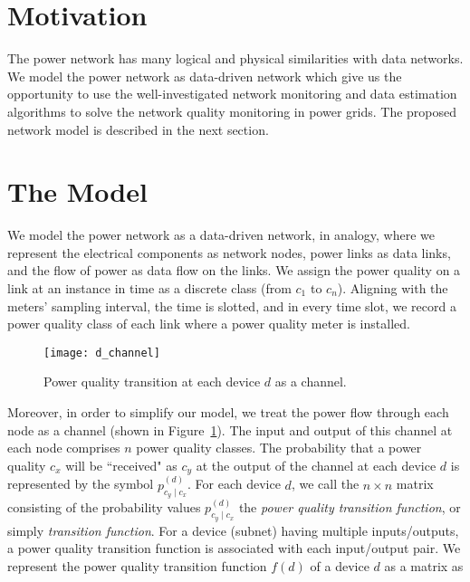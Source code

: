 \label{chap:networkModel}
\section{Motivation}
The power network has many logical and physical similarities with data networks. We model the power network as data-driven network which give us the opportunity to use the well-investigated network monitoring and data estimation algorithms to solve the network quality monitoring in power grids. The proposed network model is described in the next section.

\section{The Model}
We model the power network as a data-driven network, in analogy, where we represent the electrical components as network nodes, power links as data links, and the flow of power as data flow on the links. We assign the power quality on a link at an instance in time as a discrete class (from $c_1$ to $c_n$). Aligning with the meters' sampling interval, the time is slotted, and in every time slot, we record a power quality class of each link where a power quality meter is installed. 

\begin{figure}[!p]
    \centering
    \texttt{[image: d\_channel]}
    \vspace{0.5cm}
    \caption{Power quality transition at each device $d$ as a channel.}
    \vspace{2cm}
    \label{fig:d_channel}
\end{figure}

Moreover, in order to simplify our model, we treat the power flow through each node as a channel (shown in Figure~\ref{fig:d_channel}). The input and output of this channel at each node comprises $n$ power quality classes. The probability that a power quality $c_x$ will be ``received" as $c_y$ at the output of the channel at each device $d$ is represented by the symbol $p_{c_y  \mid c_x}^{(d)}$. For each device $d$, we call the $n\times n$ matrix consisting of the probability values  $p_{c_y  \mid c_x}^{(d)}$ the \emph{power quality transition function}, or simply \emph{transition function}. For a device (subnet) having multiple inputs/outputs, a power quality transition function is associated with each input/output pair. We represent the power quality transition function $f(d)$ of a device $d$ as a matrix as

